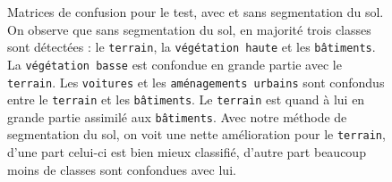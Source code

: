 \documentclass[a4paper, onecolumn, 11pt]{article}
\begin{document}
\begin{figure}[p]
    \centering
    \qquad
    \caption{Matrices de confusion pour le test, avec et sans segmentation du sol. On observe que sans segmentation du sol, en majorité trois classes sont détectées : le \texttt{terrain}, la \texttt{végétation haute} et les \texttt{bâtiments}. La \texttt{végétation basse} est confondue en grande partie avec le \texttt{terrain}. Les \texttt{voitures} et les \texttt{aménagements urbains} sont confondus entre le \texttt{terrain} et les \texttt{bâtiments}. Le \texttt{terrain} est quand à lui en grande partie assimilé aux \texttt{bâtiments}. Avec notre méthode de segmentation du sol, on voit une nette amélioration pour le \texttt{terrain}, d'une part celui-ci est bien mieux classifié, d'autre part beaucoup moins de classes sont confondues avec lui.}
    \label{fig:ground}
\end{figure}



\raggedbottom
\end{document}
